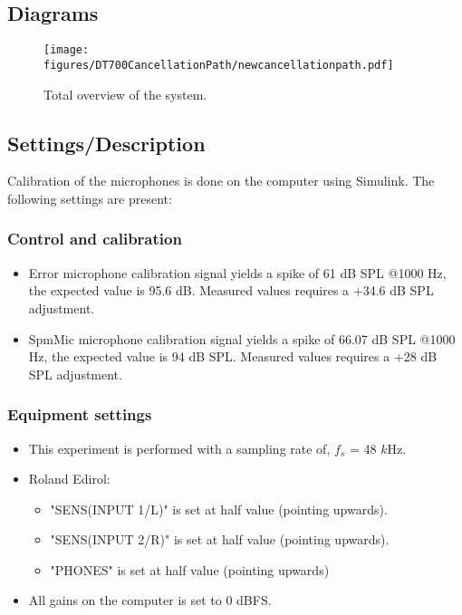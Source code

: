 \subsection{Diagrams}
\begin{figure}[H]
	\centering
	\texttt{[image: figures/DT700CancellationPath/newcancellationpath.pdf]}
	\caption{Total overview of the system.}
	\label{SchematicOverviewCP}
\end{figure}

\subsection{Settings/Description}
\label{SettingsCacellationPath}

Calibration of the microphones is done on the computer using Simulink. The following settings are present:

\subsubsection{Control and calibration}
\begin{itemize}
	\item Error microphone calibration signal yields a spike of 61 dB SPL @1000 Hz, the expected value is 95.6 dB. Measured values requires a +34.6 dB SPL adjustment.
	\item SpmMic microphone calibration signal yields a spike of 66.07 dB SPL @1000 Hz, the expected value is 94 dB SPL. Measured values requires a +28 dB SPL adjustment.
\end{itemize}


\subsubsection{Equipment settings}
\begin{itemize}
	\item This experiment is performed with a sampling rate of, $f_{s}$ = 48 $k$Hz.
	\item Roland Edirol:
		\begin{itemize}
			\item "SENS(INPUT 1/L)" is set at half value (pointing upwards).
			\item "SENS(INPUT 2/R)" is set at half value (pointing upwards).
			\item "PHONES" is set at half value (pointing upwards)
		\end{itemize}				
	\item All gains on the computer is set to 0 dBFS.
\end{itemize}


